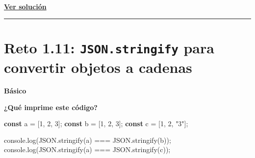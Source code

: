 \documentclass[
  letterpaper,
  DIV=11,
  numbers=noendperiod]{scrreprt}
\newenvironment{Shaded}{\begin{snugshade}}{\end{snugshade}}
\newcommand{\BuiltInTok}[1]{\textcolor[rgb]{0.00,0.23,0.31}{#1}}
\newcommand{\DecValTok}[1]{\textcolor[rgb]{0.68,0.00,0.00}{#1}}
\newcommand{\FunctionTok}[1]{\textcolor[rgb]{0.28,0.35,0.67}{#1}}
\newcommand{\KeywordTok}[1]{\textcolor[rgb]{0.00,0.23,0.31}{\textbf{#1}}}
\newcommand{\NormalTok}[1]{\textcolor[rgb]{0.00,0.23,0.31}{#1}}
\newcommand{\OperatorTok}[1]{\textcolor[rgb]{0.37,0.37,0.37}{#1}}
\newcommand{\StringTok}[1]{\textcolor[rgb]{0.13,0.47,0.30}{#1}}
\begin{document}
\textbf{\hyperref[sec-sol-cap1-reto10]{Ver solución}}

\begin{center}\rule{0.5\linewidth}{0.5pt}\end{center}

\section{\texorpdfstring{Reto 1.11: \texttt{JSON.stringify} para
convertir objetos a
cadenas}{Reto 1.11: JSON.stringify para convertir objetos a cadenas}}\label{sec-cap1-reto11}

\begin{tcolorbox}[enhanced jigsaw, left=2mm, toprule=.15mm, leftrule=.75mm, breakable, colback=white, coltitle=black, bottomtitle=1mm, arc=.35mm, rightrule=.15mm, colframe=quarto-callout-caution-color-frame, opacitybacktitle=0.6, toptitle=1mm, opacityback=0, titlerule=0mm, title=\textcolor{quarto-callout-caution-color}{\faFire}\hspace{0.5em}{Dificultad}, bottomrule=.15mm, colbacktitle=quarto-callout-caution-color!10!white]

\textbf{Básico}

\end{tcolorbox}

\textbf{¿Qué imprime este código?}

\begin{Shaded}
\begin{Highlighting}[]
\KeywordTok{const}\NormalTok{ a }\OperatorTok{=}\NormalTok{ [}\DecValTok{1}\OperatorTok{,} \DecValTok{2}\OperatorTok{,} \DecValTok{3}\NormalTok{]}\OperatorTok{;}
\KeywordTok{const}\NormalTok{ b }\OperatorTok{=}\NormalTok{ [}\DecValTok{1}\OperatorTok{,} \DecValTok{2}\OperatorTok{,} \DecValTok{3}\NormalTok{]}\OperatorTok{;}
\KeywordTok{const}\NormalTok{ c }\OperatorTok{=}\NormalTok{ [}\DecValTok{1}\OperatorTok{,} \DecValTok{2}\OperatorTok{,} \StringTok{"3"}\NormalTok{]}\OperatorTok{;}

\BuiltInTok{console}\OperatorTok{.}\FunctionTok{log}\NormalTok{(}\BuiltInTok{JSON}\OperatorTok{.}\FunctionTok{stringify}\NormalTok{(a) }\OperatorTok{===} \BuiltInTok{JSON}\OperatorTok{.}\FunctionTok{stringify}\NormalTok{(b))}\OperatorTok{;}
\BuiltInTok{console}\OperatorTok{.}\FunctionTok{log}\NormalTok{(}\BuiltInTok{JSON}\OperatorTok{.}\FunctionTok{stringify}\NormalTok{(a) }\OperatorTok{===} \BuiltInTok{JSON}\OperatorTok{.}\FunctionTok{stringify}\NormalTok{(c))}\OperatorTok{;} 
\end{Highlighting}
\end{Shaded}
\end{document}
